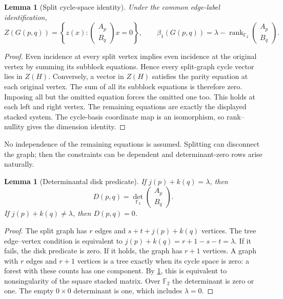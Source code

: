 \documentclass[11pt,a4paper]{article}
\newtheorem{lemma}[theorem]{Lemma}
\theoremstyle{definition}
\theoremstyle{remark}
\newcommand{\F}{\mathbb F_2}
\newcommand{\rk}{\operatorname{rank}}
\begin{document}
\begin{lemma}[Split cycle-space identity]\label{lem:split}
Under the common edge-label identification,
\begin{equation}
 Z(G(p,q))=\left\{z(x):\begin{pmatrix}A_p\\ B_q\end{pmatrix}x=0\right\},
 \qquad
 \beta_1(G(p,q))=\lambda-\rk_{\F}\begin{pmatrix}A_p\\ B_q\end{pmatrix}.
 \label{eq:split}
\end{equation}
\end{lemma}
\begin{proof}
Even incidence at every split vertex implies even incidence at the original vertex by
summing its subblock equations. Hence every split-graph cycle vector lies in $Z(H)$.
Conversely, a vector in $Z(H)$ satisfies the parity equation at each original vertex.
The sum of all its subblock equations is therefore zero. Imposing all but the omitted
equation forces the omitted one too. This holds at each left and right vertex. The
remaining equations are exactly the displayed stacked system. The cycle-basis coordinate
map is an isomorphism, so rank--nullity gives the dimension identity.
\end{proof}

No independence of the remaining equations is assumed. Splitting can disconnect the graph;
then the constraints can be dependent and determinant-zero rows arise naturally.

\begin{lemma}[Determinantal disk predicate]\label{lem:det}
If $j(p)+k(q)=\lambda$, then
\begin{equation}
              D(p,q)=\det_{\F}\begin{pmatrix}A_p\\ B_q\end{pmatrix}.
 \label{eq:det}
\end{equation}
If $j(p)+k(q)\ne\lambda$, then $D(p,q)=0$.
\end{lemma}
\begin{proof}
The split graph has $r$ edges and $s+t+j(p)+k(q)$ vertices. The tree edge--vertex
condition is equivalent to $j(p)+k(q)=r+1-s-t=\lambda$. If it fails, the disk predicate
is zero. If it holds, the graph has $r+1$ vertices. A graph with $r$ edges and $r+1$
vertices is a tree exactly when its cycle space is zero: a forest with these counts has
one component. By \cref{lem:split}, this is equivalent to nonsingularity of the square
stacked matrix. Over $\F$ the determinant is zero or one. The empty $0\times0$
determinant is one, which includes $\lambda=0$.
\end{proof}
\end{document}
